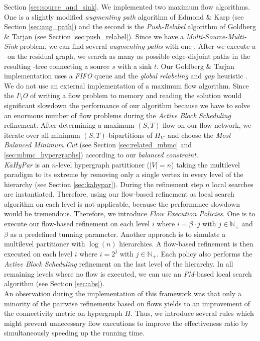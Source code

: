 Section \ref{sec:source_and_sink}. We implemented two maximum flow algorithms.
One is a slightly modified \emph{augmenting path} algorithm of Edmond \& Karp
\cite{edmonds1972theoretical} (see Section \ref{sec:aug_path}) 
and the second is the \emph{Push-Relabel} algorithm of
Goldberg \& Tarjan \cite{cherkassky1997implementing,goldberg1988new} 
(see Section \ref{sec:push_relabel}). Since we have a 
\emph{Multi-Source-Multi-Sink} problem, we can find several \emph{augmenting paths}
with one \BFS. After we execute a \BFS~on the residual graph, we search 
as many as possible edge-disjoint paths in the resulting \BFS-tree connecting a source $s$
with a sink $t$. Our Goldberg \& Tarjan implementation uses a \emph{FIFO} queue and
the \emph{global relabeling} and \emph{gap} heuristic \cite{cherkassky1997implementing}.
We do not use an external implementation of a maximum flow algorithm.
Since the \emph{I\textbackslash O} of writing a flow problem to memory and reading the
solution would significant slowdown the performance of our algorithm because we have
to solve an enormous number of flow problems during the \emph{Active Block Scheduling}
refinement. After determining a maximum $(S,T)$-flow on our flow network, we iterate over
all minimum $(S,T)$-bipartitions of $H_{V'}$ \cite{picard1980structure} and choose 
the \emph{Most Balanced Minimum Cut} (see Section \ref{sec:related_mbmc} and 
\ref{sec:mbmc_hypergraphs}) according to our \emph{balanced constraint}. \\
\emph{KaHyPar} is an $n$-level hypergraph partitioner ($|V| = n$) taking the 
multilevel paradigm to its extreme by removing only a single vertex in every level
of the hierarchy \cite{akhremtsev2017engineering} (see Section \ref{sec:kahypar}). 
During the refinement step $n$ local searches are instantiated. Therefore, 
using our flow-based refinement as local search algorithm on each level is not 
applicable, because the performance slowdown would be tremendous. Therefore,
we introduce \emph{Flow Execution Policies}. One is to execute our flow-based
refinement on each level $i$ where $i = \beta\cdot j$ with $j \in \mathbb{N}_+$ and
$\beta$ as a predefined tunning parameter. Another approach is to simulate a
multilevel partitioner with $\log(n)$ hierarchies. A flow-based refinement is then
executed on each level $i$ where $i = 2^j$ with $j \in \mathbb{N}_+$. Each policy also
performs the \emph{Active Block Scheduling} refinement on the last level of the
hierarchy. In all remaining levels where no flow is executed, we can use an 
\emph{FM}-based local search algorithm 
\cite{akhremtsev2017engineering,fiduccia1988linear,sanchis1989multiple} (see Section 
\ref{sec:abs}). \\
An observation during the implementation of this framework was that only a minority
of the pairwise refinements based on flows yields to an improvement of the connectivity
metric on hypergraph $H$. Thus, we introduce several rules which might prevent
unnecessary flow executions to improve the effectiveness ratio by simultaneously speeding up
the running time.

